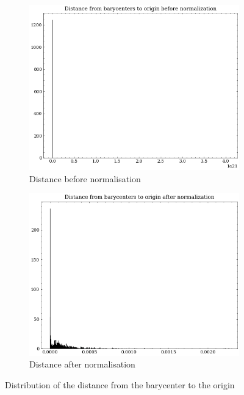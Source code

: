 \begin{figure}[H]
    \centering
    \begin{subfigure}[b]{0.45\textwidth}
        \centering
        \includegraphics[width=\textwidth]{assets/preprocessing/Distance_from_barycenters_to_origin_before_normalization.png}
        \caption{Distance before normalisation}
        \label{fig:resampling-barycenter-before}
    \end{subfigure}
    \hfill
    \begin{subfigure}[b]{0.45\textwidth}
        \centering
        \includegraphics[width=\textwidth]{assets/preprocessing/Distance_from_barycenters_to_origin_after_normalization.png}
        \caption{Distance after normalisation}
        \label{fig:resampling-barycenter-after}
    \end{subfigure}
    \caption{Distribution of the distance from the barycenter to the origin}
    \label{fig:resampling-barycenter}
\end{figure}

